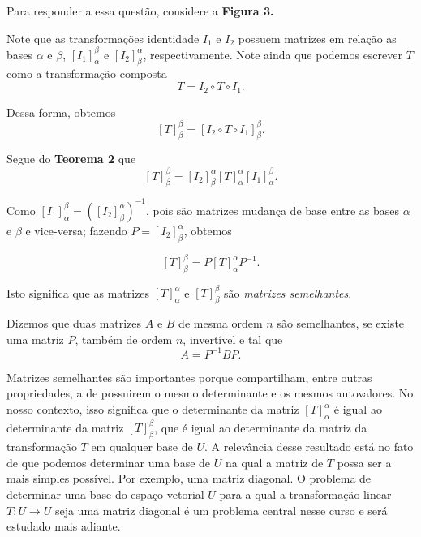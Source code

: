 Para responder a essa questão, considere  a \textbf{Figura 3.}

\begin{figure}[h!]
\center
\caption{\footnotesize{}}
\label{fig:exp}
\end{figure}

Note que as  transformações identidade $I_1$ e $I_2$ possuem matrizes em relação as bases $\alpha$ e $\beta$, $[I_1]_{\alpha}^{\beta}$  e $ [I_2]_{\beta}^{\alpha}$, respectivamente. Note ainda que podemos escrever  $T$ como a transformação composta $$ T=I_2 \circ T \circ I_1.$$

Dessa forma, obtemos
$$ [T]_{\beta}^{\beta}=[I_2 \circ T \circ I_1]_{\beta}^{\beta}.$$

Segue do \textbf{Teorema 2} que
$$ [T]_{\beta}^{\beta}=[I_2]_{\beta}^{\alpha} [ T ]_{\alpha}^{\alpha} [ I_1]_{\alpha}^{\beta}.$$

Como $[ I_1]_{\alpha}^{\beta}=([I_2]_{\beta}^{\alpha})^{-1}$, pois são matrizes mudança de base entre as bases $\alpha$ e $\beta$ e vice-versa; fazendo $P= [I_2]_{\beta}^{\alpha}$, obtemos

$$[T]_{\beta}^{\beta}=P[ T ]_{\alpha}^{\alpha}P^{-1}.$$

Isto significa que as matrizes $[T]_{\alpha}^{\alpha}$ e $[T]_{\beta}^{\beta}$ são \textit{matrizes semelhantes}.

\vspace{0.3cm}

Dizemos que duas matrizes $A$ e $B$ de mesma ordem $n$  são semelhantes, se existe uma matriz $P$, também de  ordem $n$,   invertível  e tal que $$A=P^ {-1}BP.$$


Matrizes semelhantes são importantes porque compartilham, entre outras propriedades, a de possuirem o mesmo determinante e  os mesmos autovalores. No nosso contexto, isso significa que o determinante da matriz $[T]_{\alpha}^{\alpha}$ é igual ao determinante da matriz $[T]_{\beta}^{\beta}$, que é igual ao determinante da matriz da transformação $T$ em qualquer base de $U$. A relevância desse resultado está no fato de que podemos determinar uma  base  de $U$ na qual a matriz de $T$ possa ser a mais simples possível. Por exemplo, uma matriz diagonal.  O problema de determinar uma base do espaço vetorial $U$ para a qual a transformação linear $T:U \rightarrow U$ seja uma matriz diagonal é um problema central nesse curso e será estudado mais adiante.
